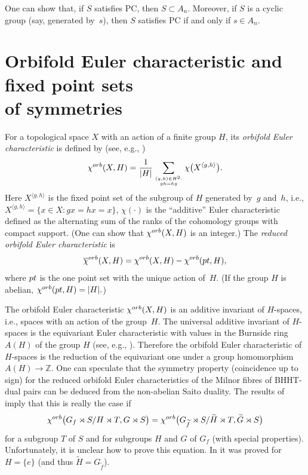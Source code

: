 \documentclass[11pt]{article}
\numberwithin{equation}{section}
\numberwithin{equation}{section}
\begin{document}
One can show that, if $S$ satisfies PC, then $S \subset A_n$. Moreover, if $S$ is a cyclic group (say, generated by~$s$), then $S$ satisfies PC if and only if $s \in A_n$.

\section[Orbifold Euler characteristic and fixed point sets of symmetries]{Orbifold Euler characteristic and fixed point sets\\ of symmetries} \label{sect:orbifold}

For a topological space $X$ with an action of a finite group $H$, its {\em orbifold Euler characteristic}
is defined by (see, e.g., \cite{AS,HH})
\begin{gather}\label{eqn:chi_orb}
{\chi}^{\rm orb}(X,H)=\frac{1}{\vert H\vert}\sum_{{(g,h)\in H^2:}\atop{gh=hg}}\chi\big(X^{\langle g,h\rangle}\big).
\end{gather}
Here $X^{\langle g,h\rangle}$ is the fixed point set of the subgroup of $H$ generated by~$g$ and~$h$, i.e.,
$X^{\langle g,h\rangle}=\{x\in X\colon gx=hx=x\}$, $\chi(\cdot)$ is the ``additive'' Euler characteristic defined as the alternating sum of the ranks of the cohomology groups with compact support. (One can show that ${\chi}^{\rm orb}(X,H)$ is an integer.) The {\em reduced orbifold Euler characteristic} is
\[
{\overline{\chi}}^{ \rm orb}(X,H)={\chi}^{\rm orb}(X,H)-{\chi}^{\rm orb}({\rm pt},H),
\]
where ${\rm pt}$ is the one point set with the unique action of~$H$. (If the group $H$ is abelian,
${\chi}^{\rm orb}({\rm pt},H)=\vert H\vert.$)

The orbifold Euler characteristic ${\chi}^{\rm orb}(X,H)$ is an additive invariant of $H$-spaces, i.e., spaces with an action of the group~$H$. The universal additive invariant of $H$-spaces is the equivariant Euler characteristic with values in the Burnside ring $A(H)$ of the group $H$ (see, e.g., \cite[Section~3]{RMS}). Therefore the orbifold Euler characteristic of $H$-spaces is the reduction of the equivariant one under a group homomorphism $A(H)\to{\mathbb Z}$. One can speculate that the symmetry property (coincidence up to sign) for the reduced orbifold Euler characteristics of the Milnor fibres of BHHT-dual pairs can be deduced from the non-abelian Saito duality. The results of \cite{EG-IMRN} imply that this is really the case if
\[
 \chi^{\rm orb}\big(G_f\rtimes S/H\rtimes T, G\rtimes S\big)=
 \chi^{\rm orb}\big(G_{\widetilde{f}}\rtimes S/\widetilde{H}\rtimes T,
 \widetilde{G}\rtimes S\big)
\]
for a subgroup $T$ of $S$ and for subgroups $H$ and $G$ of $G_f$ (with special properties).
Unfortunately, it is unclear how to prove this equation. In \cite{EG-1811} it was proved for $H=\{e\}$
(and thus $\widetilde{H}=G_{\widetilde{f}}$).
\end{document}

